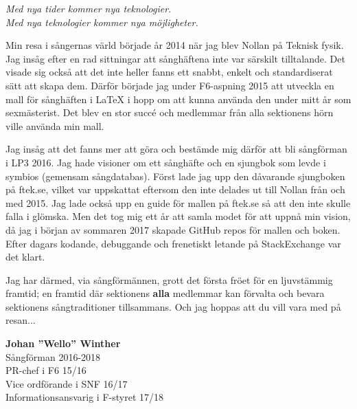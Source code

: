 {\large
\textit{Med nya tider kommer nya teknologier.}\\
\textit{Med nya teknologier kommer nya möjligheter.}

Min resa i sångernas värld började år 2014 när jag blev Nollan på Teknisk fysik. Jag insåg efter en rad sittningar att sånghäftena inte var särskilt tilltalande. Det visade sig också att det inte heller fanns ett snabbt, enkelt och standardiserat sätt att skapa dem.
Därför började jag under F6-aspning 2015 att utveckla en mall för sånghäften i LaTeX i hopp om att kunna använda den under mitt år som sexmästerist.
Det blev en stor succé och medlemmar från alla sektionens hörn ville använda min mall.

Jag insåg att det fanns mer att göra och bestämde mig därför att bli sångförman i LP3 2016.
Jag hade visioner om ett sånghäfte och en sjungbok som levde i symbios (gemensam sångdatabas).
Först lade jag upp den dåvarande sjungboken på ftek.se, vilket var uppskattat eftersom den inte delades ut till Nollan från och med 2015.
Jag lade också upp en guide för mallen på ftek.se så att den inte skulle falla i glömska.
Men det tog mig ett år att samla modet för att uppnå min vision, då jag i början av sommaren 2017 skapade GitHub repos för mallen och boken.
Efter dagars kodande, debuggande och frenetiskt letande på StackExchange var det klart.

Jag har därmed, via sångförmännen, grott det första fröet för en ljuvstämmig framtid; en framtid där sektionens \textbf{alla} medlemmar kan förvalta och bevara sektionens sångtraditioner tillsammans. Och jag hoppas att du vill vara med på resan...

\begin{flushright}
\textbf{Johan ''Wello'' Winther}\\
Sångförman 2016-2018\\
PR-chef i F6 15/16\\
Vice ordförande i SNF 16/17\\
Informationsansvarig i F-styret 17/18\\
\end{flushright}
}

\newpage

